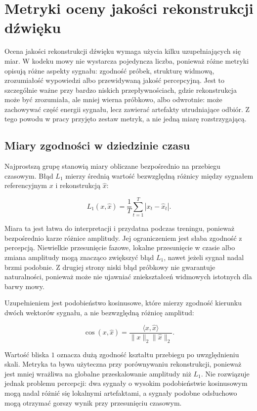 \section{Metryki oceny jakości rekonstrukcji dźwięku}
\label{sec:metryki-jakosci}

Ocena jakości rekonstrukcji dźwięku wymaga użycia kilku uzupełniających się miar. W kodeku mowy nie wystarcza pojedyncza liczba, ponieważ różne metryki opisują różne aspekty sygnału: zgodność próbek, strukturę widmową, zrozumiałość wypowiedzi albo przewidywaną jakość percepcyjną. Jest to szczególnie ważne przy bardzo niskich przepływnościach, gdzie rekonstrukcja może być zrozumiała, ale mniej wierna próbkowo, albo odwrotnie: może zachowywać część energii sygnału, lecz zawierać artefakty utrudniające odbiór. Z tego powodu w pracy przyjęto zestaw metryk, a nie jedną miarę rozstrzygającą.

\subsection{Miary zgodności w dziedzinie czasu}
\label{subsec:metryki-czasowe}

Najprostszą grupę stanowią miary obliczane bezpośrednio na przebiegu czasowym. Błąd \(L_1\) mierzy średnią wartość bezwzględną różnicy między sygnałem referencyjnym \(x\) i rekonstrukcją \(\hat{x}\):

\begin{equation}
    L_1(x,\hat{x}) = \frac{1}{T} \sum_{t=1}^{T} |x_t - \hat{x}_t|.
\end{equation}

Miara ta jest łatwa do interpretacji i przydatna podczas treningu, ponieważ bezpośrednio karze różnice amplitudy. Jej ograniczeniem jest słaba zgodność z percepcją. Niewielkie przesunięcie fazowe, lokalne przesunięcie w czasie albo zmiana amplitudy mogą znacząco zwiększyć błąd \(L_1\), nawet jeżeli sygnał nadal brzmi podobnie. Z drugiej strony niski błąd próbkowy nie gwarantuje naturalności, ponieważ może nie ujawniać zniekształceń widmowych istotnych dla barwy mowy.

Uzupełnieniem jest podobieństwo kosinusowe, które mierzy zgodność kierunku dwóch wektorów sygnału, a nie bezwzględną różnicę amplitud:

\begin{equation}
    \cos(x,\hat{x}) = \frac{\langle x,\hat{x}\rangle}{\|x\|_2 \|\hat{x}\|_2}.
\end{equation}

Wartość bliska \(1\) oznacza dużą zgodność kształtu przebiegu po uwzględnieniu skali. Metryka ta bywa użyteczna przy porównywaniu rekonstrukcji, ponieważ jest mniej wrażliwa na globalne przeskalowanie amplitudy niż \(L_1\). Nie rozwiązuje jednak problemu percepcji: dwa sygnały o wysokim podobieństwie kosinusowym mogą nadal różnić się lokalnymi artefaktami, a sygnały podobne odsłuchowo mogą otrzymać gorszy wynik przy przesunięciu czasowym.

